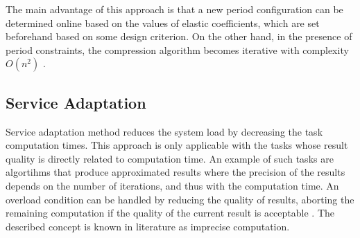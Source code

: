 The main advantage of this approach is that a new period configuration can be determined online based on the values of elastic coefficients, which are set beforehand based on some design criterion.
On the other hand, in the presence of period constraints, the compression algorithm becomes iterative with complexity \( O(n^2) \) \cite{lee2007handbook}.

\subsection{Service Adaptation}
Service adaptation method reduces the system load by decreasing the task computation times. 
This approach is only applicable with the tasks whose result quality is directly related to computation time.
An example of such tasks are algortihms that produce approximated results where the precision of the results depends on the number of iterations, and thus with the computation time. 
An overload condition can be handled by reducing the quality of results, aborting the remaining computation if the quality of the current result is acceptable \cite{shih1989scheduling}. 
The described concept is known in literature as imprecise computation. 




